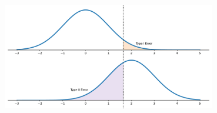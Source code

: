 
\begin{center}
    \includegraphics[width = 0.7\textwidth]{figures/specialplots/error-stack.pdf}
\end{center}
